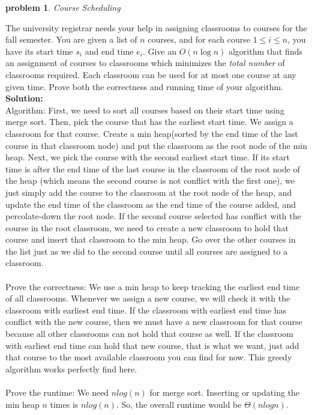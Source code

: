 \documentclass[10pt]{article}
\newcommand{\solution}[1]{\color{blue}\hfill\break\noindent\textbf{Solution:} #1\color{black}}
\newtheorem{problem}{\sc\color{cit}problem}
\begin{document}
\begin{problem}Course Scheduling\end{problem}
The university registrar needs your help in assigning classrooms to courses
for the fall semester. You are given a list of $n$ courses, and for each course $1 \le i \le n$,
you have its start time $s_i$ and end time $e_i$. Give an $O(n \log n)$
algorithm that finds an assignment of
courses to classrooms which minimizes the {\em total number} of classrooms required. Each classroom
can be used for at most one course at any given time. Prove both the correctness and running time
of your algorithm.
\solution{\\
    Algorithm: First, we need to sort all courses based on their start time using merge sort. Then, pick the course that has the earliest start time. We assign a classroom for that course. Create a min heap(sorted by the end time of the last course in that classroom node) and put the classroom as the root node of the min heap. Next, we pick the course with the second earliest start time. If its start time is after the end time of the last course in the classroom of the root node of the heap (which means the second course is not conflict with the first one), we just simply add the course to the classroom at the root node of the heap, and update the end time of the classroom as the end time of the course added, and percolate-down the root node. If the second course selected has conflict with the course in the root classroom, we need to create a new classroom to hold that course and insert that classroom to the min heap. Go over the other courses in the list just as we did to the second course until all courses are assigned to a classroom. \\ \\
    Prove the correctness: We use a min heap to keep tracking the earliest end time of all classrooms. Whenever we assign a new course, we will check it with the classroom with earliest end time. If the classroom with earliest end time has conflict with the new course, then we must have a new classroom for that course because all other classrooms can not hold that course as well. If the classroom with earliest end time can hold that new course, that is what we want, just add that course to the most available classroom you can find for now. This greedy algorithm works perfectly find here.\\ \\
    Prove the runtime:
    We need $nlog(n)$ for merge sort. Inserting or updating the min heap $n$ times is $nlog(n)$. So, the overall runtime would be $\Theta(nlogn)$.
}
\end{document}
